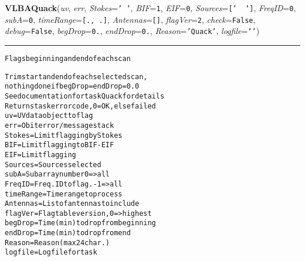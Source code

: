     \label{VLBACal:VLBAQuack}
    \vspace{0.5ex}

    \begin{boxedminipage}{\textwidth}

    \raggedright \textbf{VLBAQuack}(\textit{uv}, \textit{err}, \textit{Stokes}=\texttt{'\-~\-'\-}, \textit{BIF}=\texttt{1\-}, \textit{EIF}=\texttt{0\-}, \textit{Sources}=\texttt{[\-'\-~\-~\-'\-]\-}, \textit{FreqID}=\texttt{0\-}, \textit{subA}=\texttt{0\-}, \textit{timeRange}=\texttt{[\-.\-,\-~\-.\-]\-}, \textit{Antennas}=\texttt{[\-]\-}, \textit{flagVer}=\texttt{2\-}, \textit{check}=\texttt{F\-a\-l\-s\-e\-}, \textit{debug}=\texttt{F\-a\-l\-s\-e\-}, \textit{begDrop}=\texttt{0\-.\-}, \textit{endDrop}=\texttt{0\-.\-}, \textit{Reason}=\texttt{'\-Q\-u\-a\-c\-k\-'\-}, \textit{logfile}=\texttt{'\-'\-})

    \vspace{-1.5ex}

    \rule{\textwidth}{0.5\fboxrule}
\begin{alltt}
Flags beginning and end of each scan

Trim start and end of each selected scan,
nothing done if begDrop=endDrop=0.0
See documentation for task Quack for details
Returns task error code, 0=OK, else failed
uv       = UV data object to flag
err      = Obit error/message stack
Stokes   = Limit flagging by Stokes
BIF      = Limit flagging to BIF-EIF
EIF      = Limit flagging
Sources  = Sources selected
subA     = Subarray number 0={\textgreater}all
FreqID   = Freq. ID to flag. -1={\textgreater}all
timeRange= Time range to process
Antennas = List of antennas to include
flagVer  = Flag table version, 0 ={\textgreater} highest
begDrop  = Time (min) to drop from beginning
endDrop  = Time (min) to drop from end
Reason   = Reason (max 24 char.)
logfile  = Log file for task\end{alltt}

    \vspace{1ex}

    \end{boxedminipage}

    \label{VLBACal:VLBAQuantCor}
    \vspace{0.5ex}


